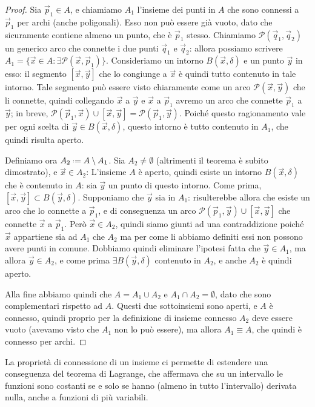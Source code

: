 \begin{proof}
	Sia $\vec p_1\in A$, e chiamiamo $A_1$ l'insieme dei punti in $A$ che sono connessi a $\vec p_1$ per archi (anche poligonali).
	Esso non può essere già vuoto, dato che sicuramente contiene almeno un punto, che è $\vec p_1$ stesso.
	Chiamiamo $\mathscr P(\vec q_1,\vec q_2)$ un generico arco che connette i due punti $\vec q_1$ e $\vec q_2$: allora possiamo scrivere $A_1=\{\vec x\in A\colon\exists\mathscr P(\vec x,\vec p_1)\}$.
	Consideriamo un intorno $B(\vec x,\delta)$ e un punto $\vec y$ in esso: il segmento $[\vec x,\vec y]$ che lo congiunge a $\vec x$ è quindi tutto contenuto in tale intorno.
	Tale segmento può essere visto chiaramente come un arco $\mathscr P(\vec x,\vec y)$ che li connette, quindi collegando $\vec x$ a $\vec y$ e $\vec x$ a $\vec p_1$ avremo un arco che connette $\vec p_1$ a $\vec y$; in breve, $\mathscr P(\vec p_1,\vec x)\cup[\vec x,\vec y]=\mathscr P(\vec p_1,\vec y)$.
	Poich\'e questo ragionamento vale per ogni scelta di $\vec y\in B(\vec x,\delta)$, questo intorno è tutto contenuto in $A_1$, che quindi risulta aperto.

	Definiamo ora $A_2\defeq A\setminus A_1$.
	Sia $A_2\neq\emptyset$ (altrimenti il teorema è subito dimostrato), e $\vec x\in A_2$: L'insieme $A$ è aperto, quindi esiste un intorno $B(\vec x,\delta)$ che è contenuto in $A$: sia $\vec y$ un punto di questo intorno.
	Come prima, $[\vec x,\vec y]\subset B(\vec y,\delta)$.
	Supponiamo che $\vec y$ sia in $A_1$: risulterebbe allora che esiste un arco che lo connette a $\vec p_1$, e di conseguenza un arco $\mathscr P(\vec p_1,\vec y)\cup[\vec x,\vec y]$ che connette $\vec x$ a $\vec p_1$.
	Però $\vec x\in A_2$, quindi siamo giunti ad una contraddizione poiché $\vec x$ appartiene sia ad $A_1$ che $A_2$ ma per come li abbiamo definiti essi non possono avere punti in comune.
	Dobbiamo quindi eliminare l'ipotesi fatta che $\vec y\in A_1$, ma allora $\vec y\in A_2$, e come prima $\exists B(\vec y,\delta)$ contenuto in $A_2$, e anche $A_2$ è quindi aperto.

	Alla fine abbiamo quindi che $A=A_1\cup A_2$ e $A_1\cap A_2=\emptyset$, dato che sono complementari rispetto ad $A$.
	Questi due sottoinsiemi sono aperti, e $A$ è connesso, quindi proprio per la definizione di insieme connesso $A_2$ deve essere vuoto (avevamo visto che $A_1$ non lo può essere), ma allora $A_1\equiv A$, che quindi è connesso per archi.
\end{proof}
La proprietà di connessione di un insieme ci permette di estendere una conseguenza del teorema di Lagrange, che affermava che su un intervallo le funzioni sono costanti se e solo se hanno (almeno in tutto l'intervallo) derivata nulla, anche a funzioni di più variabili.
